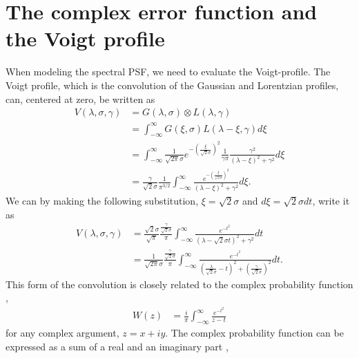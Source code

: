\documentclass{aa}    %
\begin{document}
\section{The complex error function and the Voigt profile} \label{voigt}
When modeling the spectral PSF, we need to evaluate the Voigt-profile. The Voigt profile, which is the convolution of the Gaussian and Lorentzian profiles, can, centered at zero, be written as \citep{pagnini2010} 
\begin{equation} 
\begin{split}
V(\lambda,\sigma, \gamma)  
& = G(\lambda, \sigma)  \otimes L(\lambda, \gamma) \\
& = \int_{-\infty}^{\infty} G(\xi, \sigma) L(\lambda - \xi, \gamma) d\xi \\
& = \int_{-\infty}^{\infty} \frac{1}{\sqrt{2 \pi} \sigma} e^{- \left( \frac{\xi}{\sqrt{2} \sigma}  \right)^2 } \frac{1}{\gamma \pi} \frac{\gamma^2}{(\lambda - \xi)^2 + \gamma^2} d\xi \\
& = \frac{\gamma}{\sqrt{2} \sigma} \frac{1}{ \pi^{3/2}}   \int_{-\infty}^{\infty} \frac{e^{- \left( \frac{\xi}{\sqrt{2} \sigma}  \right)^2 }}{(\lambda - \xi)^2 + \gamma^2} d\xi.
\end{split}
\end{equation}
We can by making the following substitution, $\xi = \sqrt{2} \sigma$ and $d\xi = \sqrt{2} \sigma dt$, write it as
\begin{equation} 
\begin{split}
V(\lambda,\sigma, \gamma)  
& =  \frac{\sqrt{2} \sigma}{ \sqrt{{\pi}}} \frac{\frac{\gamma}{\sqrt{2} \sigma}}{\pi}  \int_{-\infty}^{\infty} \frac{e^{- t^2 }}{(\lambda - \sqrt{2} \sigma t)^2 + \gamma^2} dt \\
& = \frac{1}{\sqrt{2 \pi} \sigma}  \frac{\frac{\gamma}{\sqrt{2} \sigma}}{\pi}  \int_{-\infty}^{\infty} \frac{e^{- t^2 }}{\left(\frac{\lambda}{\sqrt{2} \sigma} -  t\right)^2 + \left(\frac{\gamma}{\sqrt{2} \sigma}\right)^2} dt.	
\end{split}
\end{equation}
This form of the convolution is closely related to the complex probability function \citep{letchworth2007, abrarov2015a},
\begin{equation} 
\begin{split}
W(z)  
& = \frac{i}{\pi} \int_{-\infty}^{\infty} \frac{e^{-t^2}}{z - t}  
\end{split}
\end{equation}
for any complex argument, $z = x + iy$. The complex probability function can be expressed as a sum of a real and an imaginary part \citep{benner1995, abrarov2015b},
\end{document}
